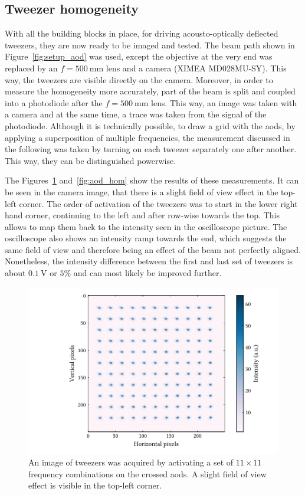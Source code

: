 \subsection{Tweezer homogeneity}

With all the building blocks in place, for driving acousto-optically deflected tweezers, they are now ready to be imaged and tested. The beam path shown in Figure~\ref{fig:setup_aod} was used, except the objective at the very end was replaced by an $f=\SI{500}{\milli\meter}$ lens and a camera (XIMEA MD028MU-SY). This way, the tweezers are visible directly on the camera. Moreover, in order to measure the homogeneity more accurately, part of the beam is split and coupled into a photodiode after the $f=\SI{500}{\milli\meter}$ lens. This way, an image was taken with a camera and at the same time, a trace was taken from the signal of the photodiode. Although it is technically possible, to draw a grid with the \acp{aod}, by applying a superposition of multiple frequencies, the measurement discussed in the following was taken by turning on each tweezer separately one after another. This way, they can be distinguished powerwise.

The Figures~\ref{fig:aod_grid} and~\ref{fig:aod_hom} show the results of these measurements. It can be seen in the camera image, that there is a slight field of view effect in the top-left corner. The order of activation of the tweezers was to start in the lower right hand corner, continuing to the left and after row-wise towards the top. This allows to map them back to the intensity seen in the oscilloscope picture. The oscilloscope also shows an intensity ramp towards the end, which suggests the same field of view and therefore being an effect of the beam not perfectly aligned. Nonetheless, the intensity difference between the first and last set of tweezers is about $\SI{0.1}{\volt}$ or $5\%$ and can most likely be improved further.

\begin{figure}[t]%
\centering
\includegraphics{figures/aod_grid_155.pdf}
\caption{An image of tweezers was acquired by activating a set of $11\times11$ frequency combinations on the crossed \acp{aod}. A slight field of view effect is visible in the top-left corner.}%
\label{fig:aod_grid}
\end{figure}

